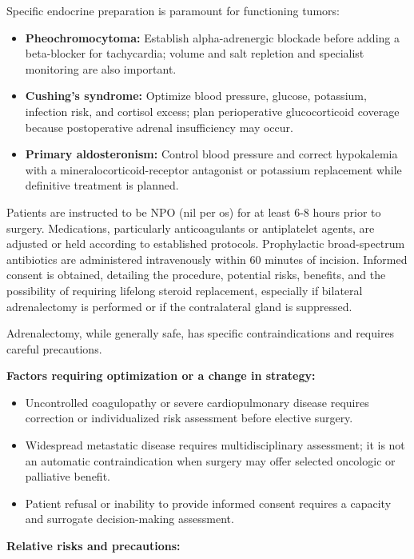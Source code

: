 Specific endocrine preparation is paramount for functioning tumors:

\begin{itemize}
  \item \textbf{Pheochromocytoma:} Establish alpha-adrenergic blockade before adding a beta-blocker for tachycardia; volume and salt repletion and specialist monitoring are also important.
  \item \textbf{Cushing's syndrome:} Optimize blood pressure, glucose, potassium, infection risk, and cortisol excess; plan perioperative glucocorticoid coverage because postoperative adrenal insufficiency may occur.
  \item \textbf{Primary aldosteronism:} Control blood pressure and correct hypokalemia with a mineralocorticoid-receptor antagonist or potassium replacement while definitive treatment is planned.
\end{itemize}

Patients are instructed to be NPO (nil per os) for at least 6-8 hours prior to surgery. Medications, particularly anticoagulants or antiplatelet agents, are adjusted or held according to established protocols. Prophylactic broad-spectrum antibiotics are administered intravenously within 60 minutes of incision. Informed consent is obtained, detailing the procedure, potential risks, benefits, and the possibility of requiring lifelong steroid replacement, especially if bilateral adrenalectomy is performed or if the contralateral gland is suppressed.

Adrenalectomy, while generally safe, has specific contraindications and requires careful precautions.

\textbf{Factors requiring optimization or a change in strategy:}

\begin{itemize}
  \item Uncontrolled coagulopathy or severe cardiopulmonary disease requires correction or individualized risk assessment before elective surgery.
  \item Widespread metastatic disease requires multidisciplinary assessment; it is not an automatic contraindication when surgery may offer selected oncologic or palliative benefit.
  \item Patient refusal or inability to provide informed consent requires a capacity and surrogate decision-making assessment.
\end{itemize}

\textbf{Relative risks and precautions:}


